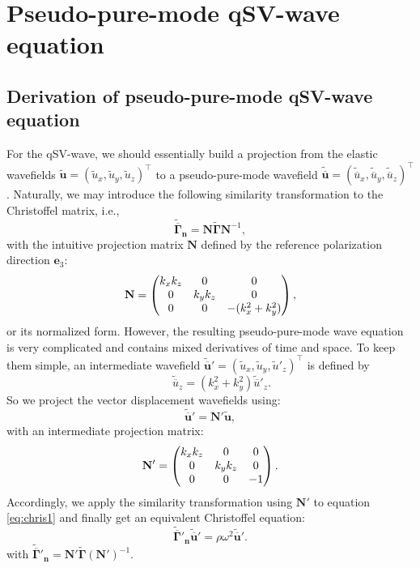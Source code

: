 %
\section{Pseudo-pure-mode qSV-wave equation}

\subsection{Derivation of pseudo-pure-mode qSV-wave equation}
For the qSV-wave, we should essentially build a projection from the elastic wavefields
$\widetilde{\mathbf{u}}=(\widetilde{u}_x,\widetilde{u}_y, \widetilde{u}_z)^{\top}$ to a pseudo-pure-mode wavefield
$\widetilde{\overline{\mathbf{u}}}=(\widetilde{\overline{u}}_x,\widetilde{\overline{u}}_y,
\widetilde{\overline{u}}_z)^{\top}$.
Naturally, we may introduce the following similarity transformation to the Christoffel
matrix, i.e.,
\begin{equation}
\label{eq:tansChrisMsv}
\widetilde{\overline{\mathbf{\Gamma}}}_\mathbf{n}=\mathbf{N}\widetilde{\mathbf{\Gamma}}\mathbf{N}^{-1},
\end{equation}
with the intuitive projection matrix $\mathbf{N}$ defined by the reference polarization direction $\mathbf{e}_3$:
\begin{equation}
\label{eq:tansMsv0}
\mathbf{N}=
\begin{pmatrix}{k_xk_z} & 0 &0 \cr
         0 & {k_yk_z} &0 \cr
         0 & 0 & {-(k^2_x+k^2_y)}\end{pmatrix},
\end{equation}
or its normalized form.
However, the resulting pseudo-pure-mode wave equation is very complicated and contains mixed
derivatives of time and space. To keep them simple, an intermediate
wavefield
${\widetilde{\overline{\mathbf{u}}}}'=(\widetilde{u}_x,\widetilde{u}_y,{\widetilde{u}}'_z)^{\top}$
is defined by
\begin{equation}
\label{eq:zcomp}
\qquad \widetilde{\overline{u}}_z=(k^2_x+k^2_y){\widetilde{\overline{u}}}'_z.
\end{equation}
So we project the vector displacement wavefields using:
\begin{equation}
\label{eq:similarTsv}
{\widetilde{\overline{\mathbf{u}}}}' =
{\mathbf{N}}'\widetilde{\mathbf{u}},
\end{equation}
with an intermediate projection matrix:
\begin{equation}
\label{eq:tansMsv}
{\mathbf{N}}'=
\begin{pmatrix}{k_xk_z} & 0 &0 \cr
         0 & {k_yk_z} &0 \cr
         0 & 0 & -1\end{pmatrix}.
\end{equation}
Accordingly, we apply the similarity transformation using ${\mathbf{N}}'$ to
equation \ref{eq:chris1} and finally get an equivalent Christoffel equation:
\begin{equation}
\label{eq:tansChrissv}
{\widetilde{\overline{\mathbf{\Gamma}}}}'_\mathbf{n}{\widetilde{\overline{\mathbf{u}}}}' =
\rho{\omega}^2{\widetilde{\overline{\mathbf{u}}}}'.
\end{equation}
with
${\widetilde{\overline{\mathbf{\Gamma}}}}'_\mathbf{n}={\mathbf{N}}'\widetilde{\mathbf{\Gamma}}(\mathbf{N}')^{-1}$.

